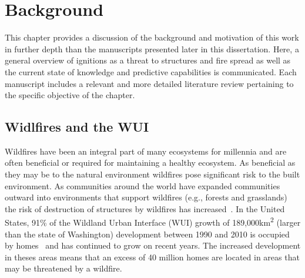 
\chapter{Background}
\label{part:literature}
    This chapter provides a discussion of the background and motivation of this work in further depth than the manuscripts presented later in this dissertation.  Here, a general overview of ignitions as a threat to structures and fire spread as well as the current state of knowledge and predictive capabilities is communicated. Each manuscript includes a relevant and more detailed literature review pertaining to the specific objective of the chapter. 

\section{Widlfires and the WUI}
    Wildfires have been an integral part of many ecosystems for millennia and are often beneficial or required for maintaining a healthy ecosystem. As beneficial as they may be to the natural environment wildfires pose significant risk to the built environment. As communities around the world have expanded communities outward into environments that support wildfires (e.g., forests and grasslands) the risk of destruction of structures by wildfires has increased~\cite{Hammer2009DemographicManagement}. In the United States, 91\% of the Wildland Urban Interface (WUI)  growth of 189,000\si{\kilo\meter\squared} (larger than the state of Washington) development between 1990 and 2010 is occupied by homes~\cite{Radeloff2017} and has continued to grow on recent years. The increased development in theses areas means that an excess of 40 million homes are located in areas that may be threatened by a wildfire. 
    
